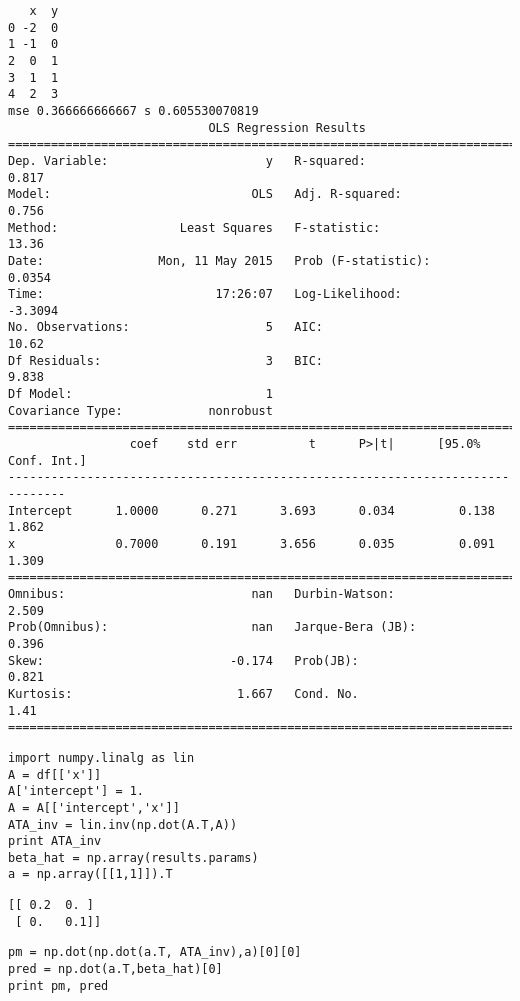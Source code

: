 \documentclass[12pt,fleqn]{article}\usepackage{../../common}
\begin{document}
\begin{verbatim}
   x  y
0 -2  0
1 -1  0
2  0  1
3  1  1
4  2  3
mse 0.366666666667 s 0.605530070819
                            OLS Regression Results                            
==============================================================================
Dep. Variable:                      y   R-squared:                       0.817
Model:                            OLS   Adj. R-squared:                  0.756
Method:                 Least Squares   F-statistic:                     13.36
Date:                Mon, 11 May 2015   Prob (F-statistic):             0.0354
Time:                        17:26:07   Log-Likelihood:                -3.3094
No. Observations:                   5   AIC:                             10.62
Df Residuals:                       3   BIC:                             9.838
Df Model:                           1                                         
Covariance Type:            nonrobust                                         
==============================================================================
                 coef    std err          t      P>|t|      [95.0% Conf. Int.]
------------------------------------------------------------------------------
Intercept      1.0000      0.271      3.693      0.034         0.138     1.862
x              0.7000      0.191      3.656      0.035         0.091     1.309
==============================================================================
Omnibus:                          nan   Durbin-Watson:                   2.509
Prob(Omnibus):                    nan   Jarque-Bera (JB):                0.396
Skew:                          -0.174   Prob(JB):                        0.821
Kurtosis:                       1.667   Cond. No.                         1.41
==============================================================================

\end{verbatim}

\begin{verbatim}
import numpy.linalg as lin
A = df[['x']]
A['intercept'] = 1.
A = A[['intercept','x']]
ATA_inv = lin.inv(np.dot(A.T,A))
print ATA_inv
beta_hat = np.array(results.params)
a = np.array([[1,1]]).T
\end{verbatim}

\begin{verbatim}
[[ 0.2  0. ]
 [ 0.   0.1]]
\end{verbatim}

\begin{verbatim}
pm = np.dot(np.dot(a.T, ATA_inv),a)[0][0]
pred = np.dot(a.T,beta_hat)[0]
print pm, pred
\end{verbatim}
\end{document}
